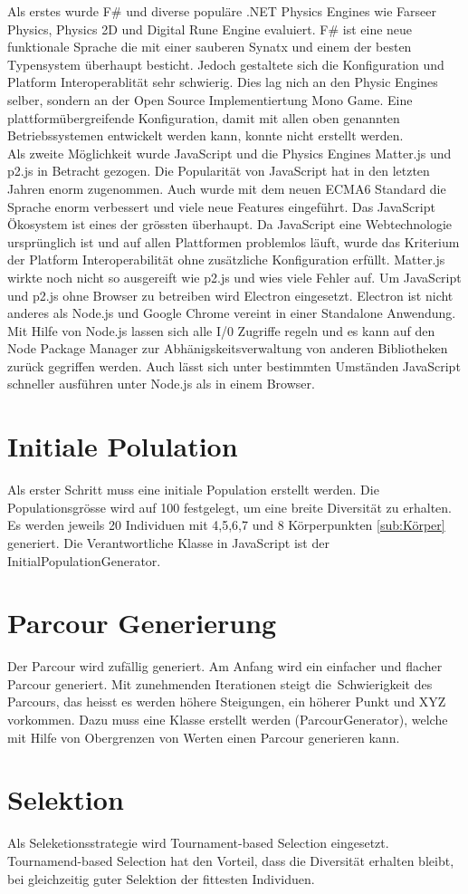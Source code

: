      Als erstes wurde F\# und diverse populäre .NET Physics Engines wie Farseer Physics, Physics 2D und Digital Rune Engine evaluiert.
     F\# ist eine neue funktionale Sprache die mit einer sauberen Synatx und einem der besten Typensystem überhaupt besticht.
     Jedoch gestaltete sich die Konfiguration und Platform Interoperablität sehr schwierig. Dies lag nich an den Physic Engines selber,
     sondern an der Open Source Implementiertung Mono Game. Eine plattformübergreifende Konfiguration,
     damit mit allen oben genannten Betriebssystemen entwickelt werden kann, konnte nicht erstellt werden.\\
     Als zweite Möglichkeit wurde JavaScript und die Physics Engines Matter.js und p2.js in Betracht gezogen.
     Die Popularität von JavaScript hat in den letzten Jahren enorm zugenommen.
     Auch wurde mit dem neuen ECMA6 Standard die Sprache enorm verbessert und viele neue Features eingeführt. Das JavaScript Ökosystem ist eines der grössten überhaupt.
     Da JavaScript eine Webtechnologie ursprünglich ist und auf allen Plattformen problemlos läuft, wurde das Kriterium der Platform Interoperabilität ohne zusätzliche Konfiguration erfüllt.
     Matter.js wirkte noch nicht so ausgereift wie p2.js und wies viele Fehler auf. Um JavaScript und p2.js ohne Browser zu betreiben wird Electron eingesetzt.
     Electron ist nicht anderes als Node.js und Google Chrome vereint in einer Standalone Anwendung.
     Mit Hilfe von Node.js lassen sich alle I/0 Zugriffe regeln und es kann auf den Node Package Manager zur Abhänigskeitsverwaltung von anderen Bibliotheken zurück gegriffen werden.
     Auch lässt sich unter bestimmten Umständen JavaScript schneller ausführen unter Node.js als in einem Browser.

  \section{Initiale Polulation}
  \label{sec:Initiale Polulation}

    Als erster Schritt muss eine initiale Population erstellt werden. Die Populationsgrösse wird auf 100 festgelegt,
    um eine breite Diversität zu erhalten. Es werden jeweils 20 Individuen mit 4,5,6,7 und 8 Körperpunkten
    \ref{sub:Körper} generiert. Die Verantwortliche Klasse in JavaScript ist der InitialPopulationGenerator.


  \section{Parcour Generierung}
  \label{sec:Parcour Generierung}
    Der Parcour wird zufällig generiert. Am Anfang wird ein einfacher und flacher Parcour generiert.
    Mit zunehmenden Iterationen steigt die Schwierigkeit des Parcours, das heisst es werden höhere Steigungen, ein höherer Punkt und XYZ vorkommen.
    Dazu muss eine Klasse erstellt werden (ParcourGenerator), welche mit Hilfe von Obergrenzen von Werten einen Parcour generieren kann.
  \section{Selektion}
  \label{sec:Selektion}

    Als Seleketionsstrategie wird Tournament-based Selection eingesetzt. Tournamend-based Selection hat den Vorteil,
    dass die Diversität erhalten bleibt, bei gleichzeitig guter Selektion der fittesten Individuen.
